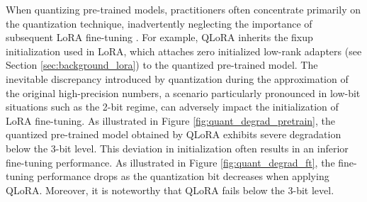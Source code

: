

When quantizing pre-trained models, practitioners often concentrate primarily on the quantization technique, inadvertently neglecting the importance of subsequent LoRA fine-tuning  \citep{dettmers2023qlora, diao2023lmflow}.
For example, QLoRA inherits the fixup initialization \citep{zhang2019fixup} used in LoRA, which  \citep{dettmers2023qlora} attaches zero initialized low-rank adapters (see Section \ref{sec:background_lora}) to the quantized pre-trained model. The inevitable discrepancy introduced by quantization during the approximation of the original high-precision numbers, a scenario particularly pronounced in low-bit situations such as the 2-bit regime, can adversely impact the initialization of LoRA fine-tuning. As illustrated in Figure \ref{fig:quant_degrad_pretrain}, the quantized pre-trained model obtained by QLoRA exhibits severe degradation below the 3-bit level. This deviation in initialization often results in an inferior fine-tuning performance. As illustrated in Figure \ref{fig:quant_degrad_ft}, the fine-tuning performance drops as the quantization bit decreases when applying QLoRA. Moreover, it is noteworthy that QLoRA fails below the 3-bit level.

